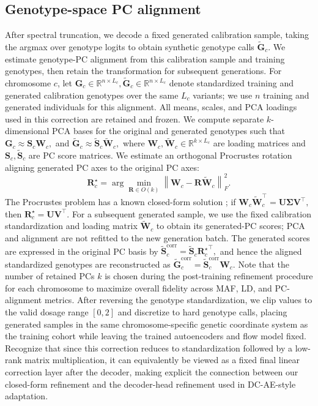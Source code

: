 \documentclass{article}
\begin{document}
\subsection{Genotype-space PC alignment}

After spectral truncation, we decode a fixed generated calibration sample, taking the argmax over genotype logits to obtain synthetic genotype calls \(\widetilde{\boldsymbol G}_c\). We estimate genotype-PC alignment from this calibration sample and training genotypes, then retain the transformation for subsequent generations. For chromosome \(c\), let
\(
\boldsymbol G_c\in\mathbb R^{n\times L_c},
\widetilde{\boldsymbol G}_c\in\mathbb R^{n\times L_c}
\)
denote standardized training and generated calibration genotypes over the same \(L_c\) variants; we use $n$ training and generated individuals for this alignment. All means, scales, and PCA loadings used in this correction are retained and frozen. We compute separate \(k\)-dimensional PCA bases for the original and generated genotypes such that 
\(
\boldsymbol G_c \approx \boldsymbol S_c\boldsymbol W_c,
\) and
\(
\widetilde{\boldsymbol G}_c \approx \widetilde{\boldsymbol S}_c\widetilde{\boldsymbol W}_c,
\)
where \(\boldsymbol W_c,\widetilde{\boldsymbol W}_c\in\mathbb R^{k\times L_c}\) are loading matrices and \(\boldsymbol S_c,\widetilde{\boldsymbol S}_c\) are PC score matrices. We estimate an orthogonal Procrustes rotation aligning generated PC axes to the original PC axes:
\[
\boldsymbol R_c^\star
=
\arg\min_{\boldsymbol R\in O(k)}
\left\|
\boldsymbol W_c-\boldsymbol R\widetilde{\boldsymbol W}_c
\right\|_F^2.
\]
The Procrustes problem has a known closed-form solution \cite{schonemann1966generalized}; if
\(
\boldsymbol W_c\widetilde{\boldsymbol W}_c^\top
=
\boldsymbol U\boldsymbol\Sigma\boldsymbol V^\top,
\)
then 
\(
\boldsymbol R_c^\star=\boldsymbol U\boldsymbol V^\top.
\)
For a subsequent generated sample, we use the fixed calibration standardization and loading matrix \(\widetilde{\boldsymbol W}_c\) to obtain its generated-PC scores; PCA and alignment are not refitted to the new generation batch. The generated scores are expressed in the original PC basis by
\(
\widetilde{\boldsymbol S}_c^{\mathrm{corr}}
=
\widetilde{\boldsymbol S}_c{\boldsymbol R_c^\star}^{\top},
\)
and hence the aligned standardized genotypes are reconstructed as
\(
\widetilde{\boldsymbol G}_c^{\mathrm{corr}}
=
\widetilde{\boldsymbol S}_c^{\mathrm{corr}}\boldsymbol W_c.
\)
Note that the number of retained PCs \(k\) is chosen during the post-training refinement procedure for each chromosome to maximize overall fidelity across MAF, LD, and PC-alignment metrics. 
After reversing the genotype standardization, we clip values to the valid dosage range \([0,2]\) and discretize to hard genotype calls, placing generated samples in the same chromosome-specific genetic coordinate system as the training cohort while leaving the trained autoencoders and flow model fixed. Recognize that since this correction reduces to standardization followed by a low-rank matrix multiplication, it can equivalently be viewed as a fixed final linear correction layer after the decoder, making explicit the connection between our closed-form refinement and the decoder-head refinement used in DC-AE-style adaptation.
\end{document}
